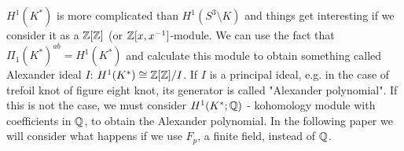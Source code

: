 $H^1(K^*)$ is more complicated than $H^1(S^3\setminus K)$ and things get interesting if we consider it as a $\operatorname{\mathbb{Z}}[\operatorname{\mathbb{Z}}]$ (or $\operatorname{\mathbb{Z}}[x, x^{-1}]$-module. We can use the fact that $\Pi_1(K^*)^{ab}=H^1(K^*)$ and calculate this module to obtain something called Alexander ideal $I$: $H^1(K^*)\cong \operatorname{\mathbb{Z}}[\operatorname{\mathbb{Z}}]/I$. If $I$ is a principal ideal, e.g. in the case of trefoil knot of figure eight knot, its generator is called "Alexander polynomial". If this is not the case, we must consider $H^1(K^*; \operatorname{\mathbb{Q}})$ - kohomology module with coefficients in $\operatorname{\mathbb{Q}}$, to obtain the Alexander polynomial. In the following paper we will consider what happens if we use $F_p$, a finite field, instead of $\operatorname{\mathbb{Q}}$.
